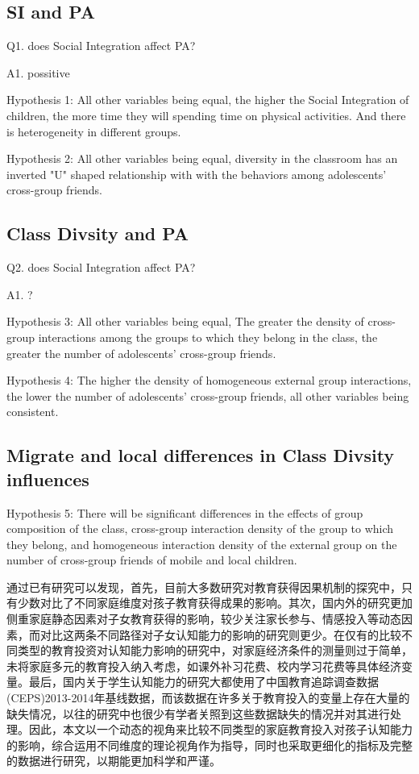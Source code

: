 \subsection{SI and PA}
Q1. does Social Integration affect PA?

A1. possitive 

Hypothesis 1: All other variables being equal, the higher the Social Integration of children, the more time they will spending time on physical activities. And there is heterogeneity in different groups.


Hypothesis 2: All other variables being equal, diversity in the classroom has an inverted "U" shaped relationship with with the behaviors among adolescents' cross-group friends.

\subsection{Class Divsity and PA}

Q2. does Social Integration affect PA?

A1. ? 

Hypothesis 3: All other variables being equal, The greater the density of cross-group interactions among the groups to which they belong in the class, the greater the number of adolescents' cross-group friends.

Hypothesis 4: The higher the density of homogeneous external group interactions, the lower the number of adolescents' cross-group friends, all other variables being consistent.

\subsection{Migrate and local differences in Class Divsity influences}

Hypothesis 5: There will be significant differences in the effects of group composition of the class, cross-group interaction density of the group to which they belong, and homogeneous interaction density of the external group on the number of cross-group friends of mobile and local children.

通过已有研究可以发现，首先，目前大多数研究对教育获得因果机制的探究中，只有少数对比了不同家庭维度对孩子教育获得成果的影响。其次，国内外的研究更加侧重家庭静态因素对子女教育获得的影响，较少关注家长参与、情感投入等动态因素，而对比这两条不同路径对子女认知能力的影响的研究则更少。在仅有的比较不同类型的教育投资对认知能力影响的研究中，对家庭经济条件的测量则过于简单，未将家庭多元的教育投入纳入考虑，如课外补习花费、校内学习花费等具体经济变量。最后，国内关于学生认知能力的研究大都使用了中国教育追踪调查数据(CEPS)2013-2014年基线数据，而该数据在许多关于教育投入的变量上存在大量的缺失情况，以往的研究中也很少有学者关照到这些数据缺失的情况并对其进行处理。因此，本文以一个动态的视角来比较不同类型的家庭教育投入对孩子认知能力的影响，综合运用不同维度的理论视角作为指导，同时也采取更细化的指标及完整的数据进行研究，以期能更加科学和严谨。